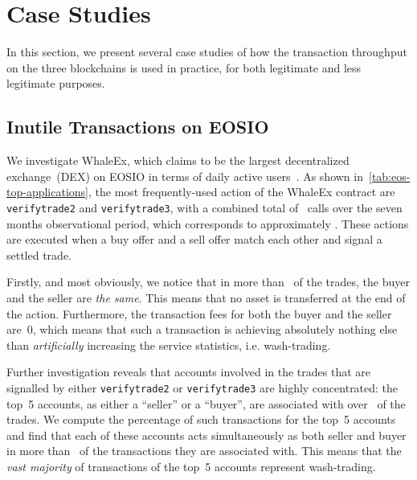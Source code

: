\section{Case Studies}
\label{sec:4:case-studies}

In this section, we present several case studies of how the transaction throughput on the three blockchains is used in practice,  for both legitimate and less legitimate purposes.

\subsection{Inutile Transactions on EOSIO}
\label{sec:eoscase}
We investigate WhaleEx, which claims to be the largest decentralized exchange~(DEX) on EOSIO in terms of daily active users~\cite{WhaleEx2020}.
As shown in~\autoref{tab:eos-top-applications}, the most frequently-used action of the WhaleEx contract are \texttt{verifytrade2} and \texttt{verifytrade3}, with a combined total of~ calls over the seven months observational period, which corresponds to approximately . These actions are executed when a buy offer and a sell offer match each other and signal a settled trade.



Firstly, and most obviously, we notice that in more than~ of the trades, the buyer and the seller are \emph{the same}.
This means that no asset is transferred at the end of the action.
Furthermore, the transaction fees for both the buyer and the seller are~0, which means that such a transaction is achieving absolutely nothing else than \emph{artificially} increasing the service statistics, i.e. wash-trading.

Further investigation reveals that accounts involved in the trades that are signalled by either \texttt{verifytrade2} or \texttt{verifytrade3} are highly concentrated: the top~5 accounts, as either a ``seller'' or a ``buyer'', are associated with over~ of the trades.
We compute the percentage of such transactions for the top~5 accounts and find that each of these accounts acts simultaneously as both seller and buyer in more than~ of the transactions they are associated with.
This means that the \emph{vast majority} of transactions of the top~5 accounts represent wash-trading.

